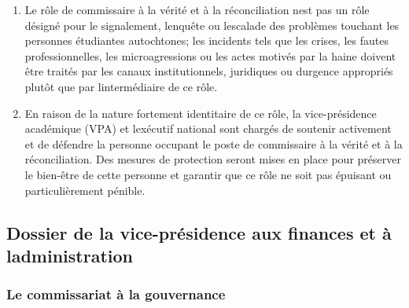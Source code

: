 \begin{enumerate}
 \item
  Le rôle de commissaire à la vérité et à la réconciliation n\textquotesingle est pas un rôle désigné pour le signalement, l\textquotesingle enquête ou l\textquotesingle escalade des problèmes touchant les personnes étudiantes autochtones; les incidents tels que les crises, les fautes professionnelles, les microagressions ou les actes motivés par la haine doivent être traités par les canaux institutionnels, juridiques ou d\textquotesingle urgence appropriés plutôt que par l\textquotesingle intermédiaire de ce rôle.
 \item
  En raison de la nature fortement identitaire de ce rôle, la vice-présidence académique (VPA) et l\textquotesingle exécutif national sont chargés de soutenir activement et de défendre la personne occupant le poste de commissaire à la vérité et à la réconciliation. Des mesures de protection seront mises en place pour préserver le bien-être de cette personne et garantir que ce rôle ne soit pas épuisant ou particulièrement pénible.
\end{enumerate}

\subsection{Dossier de la vice-présidence aux finances et à l\textquotesingle administration}
\label{portefeuille-vpfa}

\subsubsection{Le commissariat à la gouvernance}
\label{le-commissariat-a-la-gouvernance}

